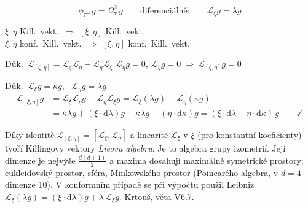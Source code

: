 \[
  \phi_{\tau*}g = \Omega^2_\tau\,g \qquad\text{diferenciálně:}\qquad \mathcal{L}_\xi g = \lambda g
\]

\begin{veta}
$\xi,\eta$ Kill.\ vekt.\ $\Rightarrow$ $[\xi,\eta]$ Kill.\ vekt. \\
$\xi,\eta$ konf.\ Kill.\ vekt.\ $\Rightarrow$ $[\xi,\eta]$ konf.\ Kill.\ vekt.
\end{veta}
Důk.\ \quad $\mathcal{L}_{[\xi,\eta]} = \mathcal{L}_\xi\mathcal{L}_\eta - \mathcal{L}_\eta\mathcal{L}_\xi$ \qquad
$\mathcal{L}_\eta g = 0,\ \mathcal{L}_\xi g = 0 \ \Rightarrow\ \mathcal{L}_{[\xi,\eta]}g = 0$

Důk.\ \quad $\mathcal{L}_\xi g = \kappa g$, \ $\mathcal{L}_\eta g = \lambda g$
\begin{align*}
  \mathcal{L}_{[\xi,\eta]}g &= \mathcal{L}_\xi\mathcal{L}_\eta g - \mathcal{L}_\eta\mathcal{L}_\xi g = \mathcal{L}_\xi(\lambda g) - \mathcal{L}_\eta(\kappa g) \\
  &= \kappa\lambda g + (\xi\cdot\mathrm{d}\lambda)g - \kappa\lambda g - (\eta\cdot\mathrm{d}\kappa)g = (\xi\cdot\mathrm{d}\lambda - \eta\cdot\mathrm{d}\kappa)\,g \qquad \checkmark
\end{align*}

\begin{vysvetleni}
Díky identitě $\mathcal{L}_{[\xi,\eta]}=[\mathcal{L}_\xi,\mathcal{L}_\eta]$ a linearitě $\mathcal{L}_\xi$ v $\xi$ (pro konstantní koeficienty) tvoří Killingovy vektory \emph{Lieovu algebru}. Je to algebra grupy izometrií. Její dimenze je nejvýše $\frac{d(d+1)}{2}$ a maxima dosahují maximálně symetrické prostory: eukleidovský prostor, sféra, Minkowského prostor (Poincarého algebra, v $d=4$ dimenze 10).
V konformním případě se při výpočtu použil Leibniz $\mathcal{L}_\xi(\lambda g)=(\xi\cdot\mathrm{d}\lambda)g+\lambda\,\mathcal{L}_\xi g$. Krtouš, věta V6.7.
\end{vysvetleni}

